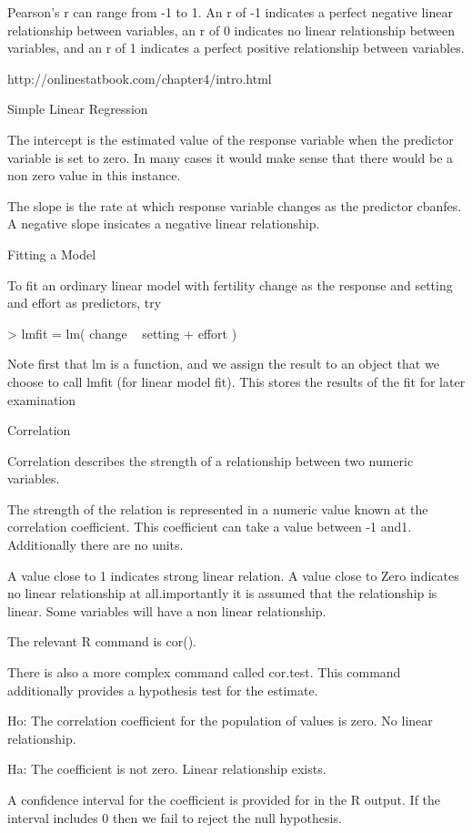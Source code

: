 Pearson's r can range from -1 to 1. An r of -1 indicates a perfect negative linear relationship between variables, an r of 0 indicates no linear relationship between variables, and an r of 1 indicates a perfect positive relationship between variables. 


http://onlinestatbook.com/chapter4/intro.html

Simple Linear Regression


The intercept is the estimated value of the response variable when the predictor variable is set to zero. In many cases it would make sense that there would be a non zero value in this instance.

The slope is the rate at which response variable changes as the predictor cbanfes. A negative slope insicates a negative linear relationship.

Fitting a Model

 To fit an ordinary linear model with fertility change as the response and setting and effort as predictors, try

 > lmfit = lm( change ~ setting + effort )

 Note first that lm is a function, and we assign the result to an object that we choose to call lmfit (for linear model fit). This stores the results of the fit for later examination


Correlation 

Correlation describes the strength of a relationship between two numeric variables.

The strength of the relation is represented in a numeric value known at the correlation coefficient. This coefficient can take a value between -1 and1. Additionally there are no units.

A value close to 1 indicates strong linear relation. A value close to Zero indicates no linear relationship at all.importantly it is assumed that the relationship is linear. Some variables will have a non linear relationship.

The relevant R command is cor().

There is also a more complex command called cor.test. This command additionally provides a hypothesis test for the estimate.

Ho: The correlation coefficient for the population of values is zero. No linear relationship.

Ha: The coefficient is not zero. Linear relationship exists.

A confidence interval for the coefficient is provided for in the R output. If the interval includes 0 then we fail to reject the null hypothesis.

